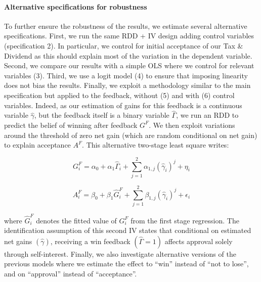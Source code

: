 \documentclass[12pt]{article} %
\providecommand{\DIFaddtex}[1]{{\protect\color{blue}\uwave{#1}}} %
\providecommand{\DIFaddbegin}{} %
\providecommand{\DIFaddend}{} %
\providecommand{\DIFadd}[1]{\texorpdfstring{\DIFaddtex{#1}}{#1}} %
\newcommand{\DIFaddincludegraphics}[2][]{{\color{blue}\fbox{\DIFOincludegraphics[#1]{#2}}}} %
\DeclareRobustCommand{\DIFaddbegin}{\DIFOaddbegin \let\includegraphics\DIFaddincludegraphics} %
\DeclareRobustCommand{\DIFaddend}{\DIFOaddend \let\includegraphics\DIFOincludegraphics} %
\begin{document}
\paragraph{Alternative specifications for robustness}

To further ensure the robustness of the results, we estimate several alternative specifications. First, we run the same RDD + IV design adding control variables (specification 2). In particular, we control for initial acceptance of our Tax \& Dividend as this should explain most of the variation in the dependent variable. Second, we compare our results with a simple OLS where we control for relevant variables (3). Third, we use a logit model (4) to ensure that imposing linearity does not bias the results. Finally, we exploit a methodology similar to the main specification but applied to the \DIFaddbegin \DIFadd{customized }\DIFaddend feedback, without (5) and with (6) control variables. Indeed, as our estimation of gains for this feedback is a continuous variable $\widehat{\gamma}$, but the feedback itself is a binary variable $\widehat{\Gamma}$, we run an RDD to predict the belief of winning after feedback $G^F$. We then exploit variations around the threshold of zero net gain (which are random conditional on net gain) to explain acceptance $A^F$. This alternative two-stage least square writes: %

\begin{equation}
    G_i^F = \alpha_0 + \alpha_1 \widehat{\Gamma}_{i} + \sum_{j=1}^2 \alpha_{1,j} (\widehat{\gamma}_{i})^{j} + \eta_i
    \label{eq:first_stage_parametric_rdd_approve_winner_feedback}
\end{equation}

\vspace{-.0cm}

\begin{equation}
    A_i^F = \beta_0 + \beta_1 \widehat{G}_i^F + \sum_{j=1}^2 \beta_{1,j} (\widehat{\gamma}_{i})^{j} + \epsilon_i
    \label{eq:second_stage_feed_with_rdd_approve_winner}
\end{equation}

\vspace{.5cm}

\noindent
where $\widehat{G}_i^F$ denotes the fitted value of $G_i^F$ from the first stage regression. The identification assumption of this second IV states that conditional on estimated net gains $(\widehat{\gamma})$, receiving a win feedback $(\widehat{\Gamma} = 1)$ affects approval solely through self-interest. Finally, we also investigate alternative versions of the previous models where we estimate the effect to ``win'' instead of ``not to lose'', and on ``approval'' instead of ``acceptance''.
\end{document}

